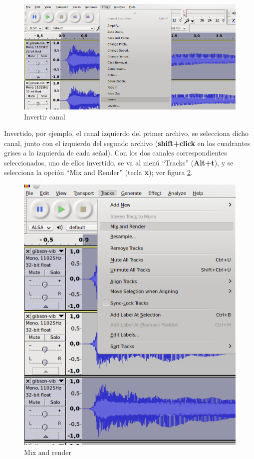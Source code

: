 \documentclass[a4paper,spanish,12pt]{article}
\begin{document}
\begin{figure}[H]
    \centering
    \includegraphics[scale=0.68]{imagenes/audacity-invert.png}
    \caption{Invertir canal}
    \label{fig:audacity-invert}
\end{figure}

Invertido, por ejemplo, el canal izquierdo del primer archivo, se selecciona dicho canal, junto con el izquierdo del segundo archivo (\textbf{shift+click} en los cuadrantes grises a la izquierda de cada señal). Con los dos canales correspondientes seleccionados, uno de ellos invertido, se va al menú ``Tracks'' (\textbf{Alt+t}), y se selecciona la opción ``Mix and Render'' (tecla \textbf{x}); ver figura \ref{fig:audacity-mix-and-render}.

\begin{figure}[H]
    \centering
    \includegraphics[scale=0.70]{imagenes/audacity-mix-and-render.png}
    \caption{Mix and render}
    \label{fig:audacity-mix-and-render}
\end{figure}
\end{document}
